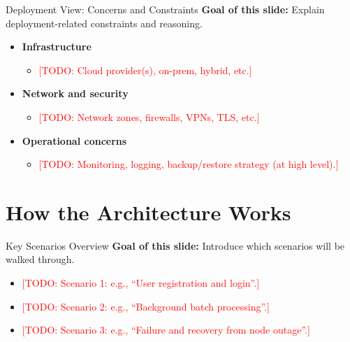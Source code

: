 \documentclass[aspectratio=169]{beamer}
\newcommand{\TODO}[1]{\textcolor{red}{[TODO: #1]}}
\begin{document}
\begin{frame}{Deployment View: Concerns and Constraints}
  \textbf{Goal of this slide:} Explain deployment-related constraints and reasoning.

  \begin{itemize}
    \item \textbf{Infrastructure}
      \begin{itemize}
        \item \TODO{Cloud provider(s), on-prem, hybrid, etc.}
      \end{itemize}
    \item \textbf{Network and security}
      \begin{itemize}
        \item \TODO{Network zones, firewalls, VPNs, TLS, etc.}
      \end{itemize}
    \item \textbf{Operational concerns}
      \begin{itemize}
        \item \TODO{Monitoring, logging, backup/restore strategy (at high level).}
      \end{itemize}
  \end{itemize}
\end{frame}

\section{How the Architecture Works}


\begin{frame}{Key Scenarios Overview}
  \textbf{Goal of this slide:} Introduce which scenarios will be walked through.

  \begin{itemize}
    \item \TODO{Scenario 1: e.g., “User registration and login”.}
    \item \TODO{Scenario 2: e.g., “Background batch processing”.}
    \item \TODO{Scenario 3: e.g., “Failure and recovery from node outage”.}
  \end{itemize}
\end{frame}
\end{document}
